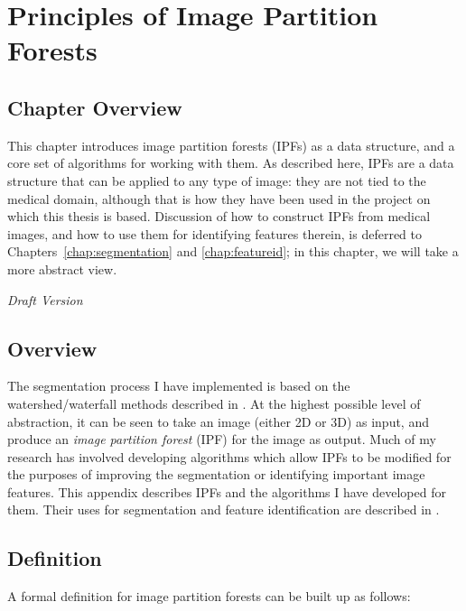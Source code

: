 \chapter{Principles of Image Partition Forests}
\label{chap:ipfs}

\section{Chapter Overview}

This chapter introduces image partition forests (IPFs) as a data structure, and a core set of algorithms for working with them. As described here, IPFs are a data structure that can be applied to any type of image: they are not tied to the medical domain, although that is how they have been used in the project on which this thesis is based. Discussion of how to construct IPFs from medical images, and how to use them for identifying features therein, is deferred to Chapters~\ref{chap:segmentation} and \ref{chap:featureid}; in this chapter, we will take a more abstract view.

\vspace{\baselineskip}

\emph{Draft Version}

\def\acronym#1{\mbox{\textup{\textbf{#1}}}}

\section{Overview}

The segmentation process I have implemented is based on the watershed/waterfall methods described in \cite{meijster98,marcotegui05}. At the highest possible level of abstraction, it can be seen to take an image (either 2D or 3D) as input, and produce an \emph{image partition forest} (IPF) for the image as output. Much of my research has involved developing algorithms which allow IPFs to be modified for the purposes of improving the segmentation or identifying important image features. This appendix describes IPFs and the algorithms I have developed for them. Their uses for segmentation and feature identification are described in \cite{gvccimi08,gvcispa09}.


\section{Definition}

A formal definition for image partition forests can be built up as follows:

